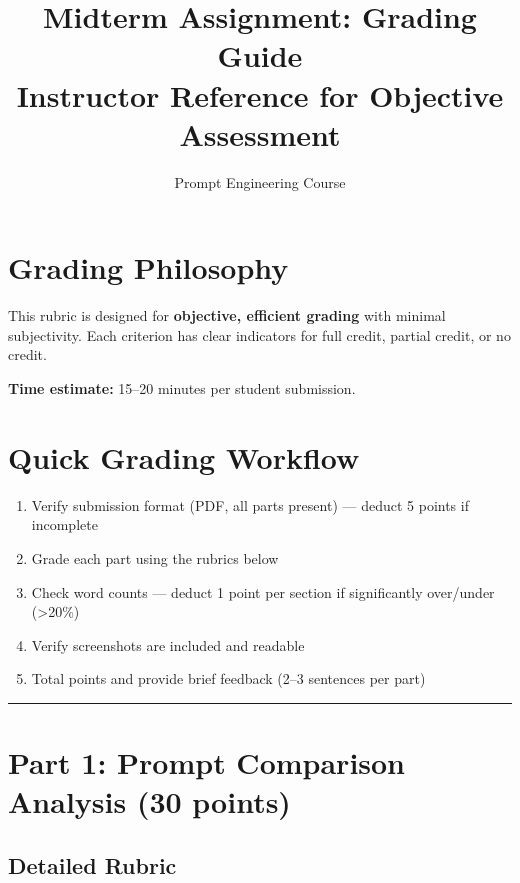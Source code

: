 \documentclass[11pt]{article}
\title{\textbf{Midterm Assignment: Grading Guide}\\
\large Instructor Reference for Objective Assessment}
\author{Prompt Engineering Course}
\date{}
\begin{document}
\maketitle

\section*{Grading Philosophy}

This rubric is designed for \textbf{objective, efficient grading} with minimal subjectivity. Each criterion has clear indicators for full credit, partial credit, or no credit.

\textbf{Time estimate:} 15--20 minutes per student submission.

\section*{Quick Grading Workflow}

\begin{enumerate}
    \item Verify submission format (PDF, all parts present) --- deduct 5 points if incomplete
    \item Grade each part using the rubrics below
    \item Check word counts --- deduct 1 point per section if significantly over/under (>20\%)
    \item Verify screenshots are included and readable
    \item Total points and provide brief feedback (2--3 sentences per part)
\end{enumerate}

\hrule
\vspace{0.5cm}

\section{Part 1: Prompt Comparison Analysis (30 points)}

\subsection*{Detailed Rubric}
\end{document}
